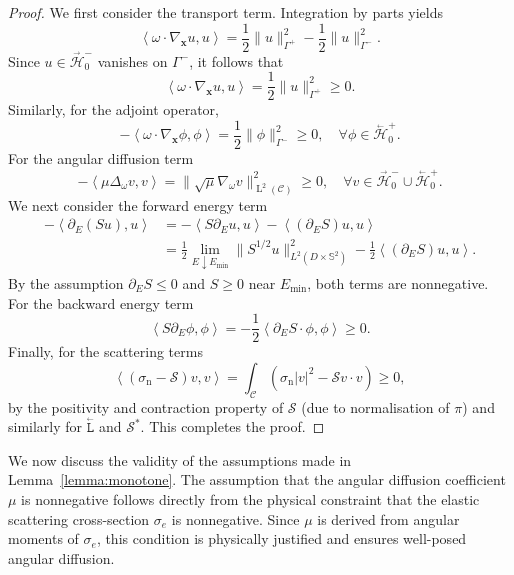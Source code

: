 \documentclass{amsart}
\newcommand{\bL}{\stackrel{_\leftarrow}{\mathtt L}}
\theoremstyle{plain}
\renewcommand{\vec}[1]{\ensuremath{\boldsymbol{#1}}}
\newcommand{\leb}{\text{Leb}}
\newcommand{\LL}{\ensuremath{\operatorname L}\xspace}
\renewcommand{\leb}[1]{\ensuremath{\LL^{#1}}}
\newcommand{\ltwop}[2]{\ensuremath{\!\left\langle{#1,#2}\right\rangle}}
\newcommand{\cH}{\stackrel{_\rightarrow}{\mathscr H}}
\newcommand{\cbH}{\stackrel{_\leftarrow}{\mathscr H}}
\newcommand{\cS}{\ensuremath{\mathscr S}}
\begin{document}
\begin{proof}
We first consider the transport term. Integration by parts yields
\begin{equation}
  \ltwop{\omega \cdot \nabla_{\vec x} u}{u}
  =
  \frac{1}{2} \|u\|^2_{\Gamma^+}
  - \frac{1}{2} \|u\|^2_{\Gamma^-}.
\end{equation}
Since $u \in \cH_0^-$ vanishes on $\Gamma^-$, it follows that
\begin{equation}
  \ltwop{\omega \cdot \nabla_{\vec x} u}{u}
  = \frac{1}{2} \|u\|^2_{\Gamma^+} \geq 0.
\end{equation}
Similarly, for the adjoint operator,
\begin{equation}
  -\ltwop{\omega \cdot \nabla_{\vec x} \phi}{\phi}
  = \frac{1}{2} \|\phi\|^2_{\Gamma^-} \geq 0,
  \quad \forall \phi \in \cbH_0^+.
\end{equation}
For the angular diffusion term
\begin{equation}
  -\ltwop{\mu \Delta_\omega v}{v}
  = \|\sqrt{\mu} \nabla_\omega v\|^2_{\leb2(\mathcal{C})} \geq 0,
  \quad \forall v \in \cH_0^- \cup \cbH_0^+.
\end{equation}
We next consider the forward energy term
\begin{align}
  -\ltwop{\partial_E(S u)}{u}
  &= - \ltwop{S \partial_E u}{u} - \ltwop{(\partial_E S) u}{u} \\
  &= \frac{1}{2} \lim_{E \downarrow E_{\min}} \|S^{1/2} u\|^2_{L^2(D \times \mathbb{S}^2)}
  - \frac{1}{2} \ltwop{(\partial_E S) u}{u}.
\end{align}
By the assumption $\partial_E S \leq 0$ and $S \geq 0$ near
$E_{\min}$, both terms are nonnegative. For the backward energy term
\begin{equation}
  \ltwop{S \partial_E \phi}{\phi}
  = - \frac{1}{2} \ltwop{\partial_E S \cdot \phi}{\phi} \geq 0.
\end{equation}
Finally, for the scattering terms
\begin{equation}
  \ltwop{(\sigma_{\mathrm{n}} - \cS) v}{v}
  = \int_{\mathcal{C}} \left( \sigma_{\mathrm{n}} |v|^2 - \cS v \cdot v \right) \geq 0,
\end{equation}
by the positivity and contraction property of $\cS$ (due to
normalisation of $\pi$) and similarly for $\bL$ and $\cS^*$. This
completes the proof.
\end{proof}

We now discuss the validity of the assumptions made in
Lemma~\ref{lemma:monotone}. The assumption that the angular diffusion
coefficient $\mu$ is nonnegative follows directly from the physical
constraint that the elastic scattering cross-section $\sigma_e$ is
nonnegative. Since $\mu$ is derived from angular moments of
$\sigma_e$, this condition is physically justified and ensures
well-posed angular diffusion.
\end{document}
